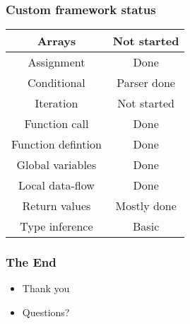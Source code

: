 \documentclass{beamer}
\begin{document}
\begin{frame}
  \frametitle{Custom framework status}
  
  \begin{table}
    \centering
    \begin{tabular}{|c|c|}
      \hline
      Arrays             & \cellcolor{red} Not started \\ \hline
      Assignment         & \cellcolor{green} Done \\ \hline
      Conditional        & \cellcolor{yellow} Parser done \\ \hline
      Iteration          & \cellcolor{red} Not started \\ \hline
      Function call      & \cellcolor{green} Done \\ \hline
      Function defintion & \cellcolor{green} Done \\ \hline
      Global variables   & \cellcolor{green} Done \\ \hline
      Local data-flow    & \cellcolor{green} Done \\ \hline
      Return values      & \cellcolor{yellow} Mostly done \\ \hline
      Type inference     & \cellcolor{green} Basic \\
      \hline
    \end{tabular}
  \end{table}
\end{frame}

\begin{frame}
  \frametitle{The End}
  
  \begin{itemize}
  \item Thank you
  \item Questions?
  \end{itemize}
\end{frame}
\end{document}
